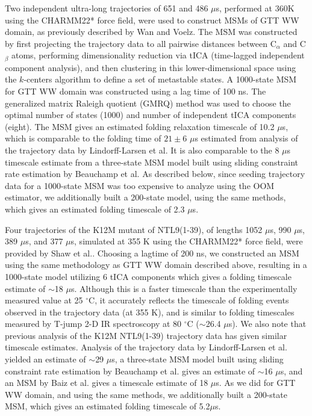 \documentclass[%
 aip,
rsi,%
 amsmath,amssymb,
 reprint,%
]{revtex4-1}
\begin{document}
Two independent ultra-long trajectories of 651 and 486 $\mu$s, performed at 360K using the CHARMM22* force field, were used to construct MSMs of GTT WW domain, as previously described by Wan and Voelz.\cite{Wan:2016fz}   The MSM was constructed by first projecting the trajectory data to all pairwise distances between C$_{\alpha}$ and C$_{\beta}$ atoms, performing dimensionality reduction via  tICA (time-lagged independent component analysis),\cite{Schwantes:2013bp, PerezHernandez:2013tt} and then clustering in this lower-dimensional space using the $k$-centers algorithm to define a set of metastable states.  A 1000-state MSM for GTT WW domain was constructed using a lag time of 100 ns.  The generalized matrix Raleigh quotient (GMRQ) method\cite{McGibbon:2015gm} was used to choose the optimal number of states (1000) and number of independent tICA components (eight).   The MSM gives an estimated folding relaxation timescale of 10.2 $\mu$s, which is comparable to the folding time of $21 \pm 6$ $\mu$s estimated from analysis of the trajectory data by Lindorff-Larsen et al.\cite{LindorffLarsen:2011gla}  It is also comparable to the 8 $\mu$s timescale estimate from a three-state MSM model built using sliding constraint rate estimation by Beauchamp et al.\cite{Beauchamp:2012kp}  As described below, since seeding trajectory data for a 1000-state MSM was too expensive to analyze using the OOM estimator, we additionally built a 200-state model, using the same methods, which gives an estimated folding timescale of 2.3 $\mu$s.

Four trajectories of the K12M mutant of NTL9(1-39), of lengths 1052 $\mu$s, 990 $\mu$s, 389 $\mu$s, and 377 $\mu$s, simulated at 355 K using the CHARMM22* force field, were provided by Shaw et al.\cite{LindorffLarsen:2011gla}.  Choosing a lagtime of 200 ns, we constructed an MSM using the same methodology as GTT WW domain described above, resulting in a 1000-state model utilizing 6 tICA components which gives a folding timescale estimate of $\sim$18 $\mu$s.  Although this is a faster timescale than the experimentally measured value at 25 $^{\circ}$C, it accurately reflects the timescale of folding events observed in the trajectory data (at 355 K), and is similar to folding timescales measured by T-jump 2-D IR spectroscopy at 80 $^{\circ}$C ($\sim$26.4 $\mu$s).\cite{Baiz:2014gm} We also note that previous analysis of the K12M NTL9(1-39) trajectory data has given similar timescale estimates. Analysis of the trajectory data by Lindorff-Larsen et al. yielded an estimate of $\sim$29 $\mu$s,\cite{LindorffLarsen:2011gla} a three-state MSM model built using sliding constraint rate estimation by Beauchamp et al. gives an estimate of $\sim$16 $\mu$s,\cite{Beauchamp:2012kp} and an MSM by Baiz et al. gives a timescale estimate of 18 $\mu$s.\cite{Baiz:2014gm}  As we did for GTT WW domain, and using the same methods, we additionally built a 200-state MSM, which gives an estimated folding timescale of 5.2$\mu$s.
\end{document}

